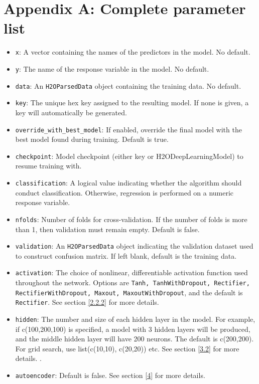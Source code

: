 \documentclass[11pt]{article}
\begin{document}
\section{Appendix A: Complete parameter list}
\begin{itemize}
\item \texttt{x}: A vector containing the names of the predictors in the model. No default.
\item \texttt{y}: The name of the response variable in the model. No default.
\item \texttt{data}: An \texttt{H2OParsedData} object containing the training data. No default.
\item \texttt{key}: The unique hex key assigned to the resulting model. If none is given, a key will automatically be generated.
\item \texttt{override\_with\_best\_model}: If enabled, override the final model with the best model found during training. Default is true.
\item \texttt{checkpoint}: Model checkpoint (either key or H2ODeepLearningModel) to resume training with.
\item \texttt{classification}: A logical value indicating whether the algorithm should conduct classification. Otherwise, regression is performed on a numeric response variable.
\item \texttt{nfolds}: Number of folds for cross-validation. If the number of folds is more than 1, then validation must remain empty. Default is false.
\item \texttt{validation}: An \texttt{H2OParsedData} object indicating the validation dataset used to construct confusion matrix. If left blank, default is the training data.
\item \texttt{activation}: The choice of nonlinear, differentiable activation function used throughout the network. Options are \texttt{Tanh, TanhWithDropout, Rectifier, RectifierWithDropout, Maxout, MaxoutWithDropout}, and the default is \texttt{Rectifier}. See section \ref{2.2.2} for more details.
\item \texttt{hidden}: The number and size of each hidden layer in the model. For example, if c(100,200,100) is specified, a model with 3 hidden layers will be produced, and the middle hidden layer will have 200 neurons. The default is c(200,200). For grid search, use list(c(10,10), c(20,20)) etc. See section \ref{3.2} for more details. .
\item \texttt{autoencoder}: Default is false. See section \ref{4} for more details.

\end{itemize}
\end{document}
